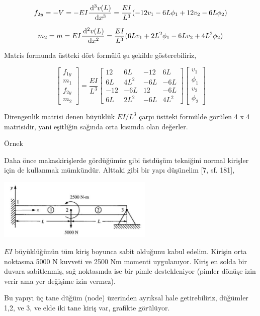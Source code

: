\documentclass[12pt,fleqn]{article}\usepackage{../../common}
\begin{document}
$$
f_{2y} = -V = -EI \frac{\,\mathrm{d}^3 v(L)}{\,\mathrm{d} x^3} =
\frac{EI}{L^3} (-12 v_1 - 6L \phi_1 + 12 v_2 - 6L \phi_2 )
$$

$$
m_2 = m = EI \frac{\,\mathrm{d}^2 v(L)}{\,\mathrm{d} x^2} =
\frac{EI}{L^3} ( 6L v_1 + 2L^2 \phi_1 - 6L v_2 + 4 L^2 \phi_2)
$$

Matris formunda üstteki dört formülü şu şekilde gösterebiliriz,

$$
\left[\begin{array}{c}
f_{1y} \\ m_1 \\ f_{2y} \\ m_2
\end{array}\right] =
\frac{EI}{L^3}
\left[\begin{array}{cccc}
12 & 6L & -12 & 6L \\
6L & 4L^2 & -6L & -6L \\
-12 & -6L & 12 & -6L \\
6L & 2L^2 & -6L & 4L^2
\end{array}\right]
\left[\begin{array}{ccc}
v_1 \\ \phi_1 \\ v_2 \\ \phi_2
\end{array}\right]
$$

Direngenlik matrisi denen büyüklük $EI / L^3$ çarpı üstteki formülde görülen
4 x 4 matrisidir, yani eşitliğin sağında orta kısımda olan değerler.

Örnek

Daha önce makaskirişlerde gördüğümüz gibi üstdüşüm tekniğini normal kirişler
için de kullanmak mümkündür. Alttaki gibi bir yapı düşünelim [7, sf. 181],

\includegraphics[width=20em]{phy_020_strs_06_01.jpg}

$EI$ büyüklüğünün tüm kiriş boyunca sabit olduğunu kabul edelim. Kirişin orta
noktasına 5000 N kuvveti ve 2500 Nm momenti uygulanıyor. Kiriş en solda bir
duvara sabitlenmiş, sağ noktasında ise bir pimle destekleniyor (pimler
dönüşe izin verir ama yer değişime izin vermez). 

Bu yapıyı üç tane düğüm (node) üzerinden ayrıksal hale getirebiliriz,
düğümler 1,2, ve 3, ve elde iki tane kiriş var, grafikte görülüyor.
\end{document}
